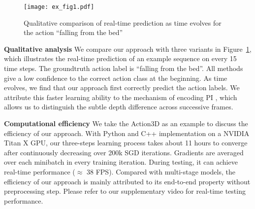 \documentclass[10pt,twocolumn,letterpaper]{article}
\begin{document}


\begin{figure}[t]
\centering
   \texttt{[image: ex\_fig1.pdf]}
 
\caption{Qualitative comparison of real-time prediction as time evolves for the action ``falling from the bed''}
\label{fig:ex_frame}
\end{figure}




\noindent \textbf{Qualitative analysis} We compare our approach with three variants in Figure~\ref{fig:ex_frame}, which illustrates the real-time prediction of an example sequence on every 15 time steps. The groundtruth action label is ``falling from the bed''. All methods give a low confidence to the correct action class at the beginning. As time evolves, we find that our approach first correctly predict the action labels. We attribute this faster learning ability to the mechanism of encoding PI \cite{Seungryul_wacv_2016}, which allows us to distinguish the subtle depth difference across successive frames. 





\noindent \textbf{Computational efficiency} We take the Action3D as an example to discuss the efficiency of our approach.  With Python and C++ implementation on a NVIDIA Titan X GPU, our three-steps learning process takes about 11 hours to converge after continuously decreasing over 200k SGD iterations. Gradients are averaged over each minibatch in every training iteration. During testing, it can achieve real-time performance ($\approx$ 38 FPS). Compared with multi-stage models, the efficiency of our approach is mainly attributed to its end-to-end property without preprocessing step. Please refer to our supplementary video for real-time testing performance.


\vspace{-0.3cm}
\end{document}
